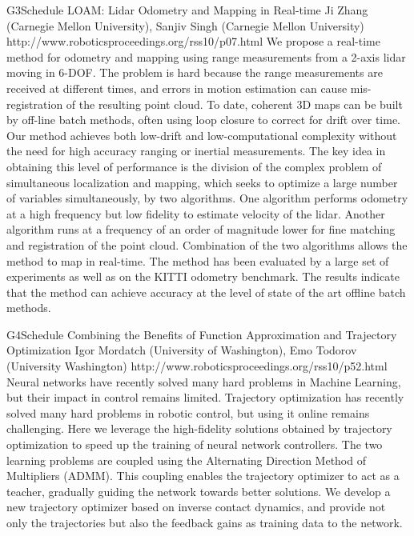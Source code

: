 \begin{spacing}{1.0}
\descriptionPaper
{G3}{Schedule}
{	
LOAM: Lidar Odometry and Mapping in Real-time
}
{
Ji Zhang (Carnegie Mellon University), Sanjiv Singh (Carnegie Mellon University)
}
{
http://www.roboticsproceedings.org/rss10/p07.html
}
{
We propose a real-time method for odometry and mapping using range measurements from a 2-axis lidar moving in 6-DOF. The problem is hard because the range measurements are received at different times, and errors in motion estimation can cause mis-registration of the resulting point cloud. To date, coherent 3D maps can be built by off-line batch methods, often using loop closure to correct for drift over time. Our method achieves both low-drift and low-computational complexity without the need for high accuracy ranging or inertial measurements. The key idea in obtaining this level of performance is the division of the complex problem of simultaneous localization and mapping, which seeks to optimize a large number of variables simultaneously, by two algorithms. One algorithm performs odometry at a high frequency but low fidelity to estimate velocity of the lidar. Another algorithm runs at a frequency of an order of magnitude lower for fine matching and registration of the point cloud. Combination of the two algorithms allows the method to map in real-time. The method has been evaluated by a large set of experiments as well as on the KITTI odometry benchmark. The results indicate that the method can achieve accuracy at the level of state of the art offline batch methods.
}




\descriptionPaper
{G4}{Schedule}
{	
Combining the Benefits of Function Approximation and Trajectory Optimization
}
{
Igor Mordatch (University of Washington), Emo Todorov (University Washington)
}
{
http://www.roboticsproceedings.org/rss10/p52.html
}
{
Neural networks have recently solved many hard problems in Machine Learning, but their impact in control remains limited. Trajectory optimization has recently solved many hard problems in robotic control, but using it online remains challenging. Here we leverage the high-fidelity solutions obtained by trajectory optimization to speed up the training of neural network controllers. The two learning problems are coupled using the Alternating Direction Method of Multipliers (ADMM). This coupling enables the trajectory optimizer to act as a teacher, gradually guiding the network towards better solutions. We develop a new trajectory optimizer based on inverse contact dynamics, and provide not only the trajectories but also the feedback gains as training data to the network.
}




\end{spacing}
